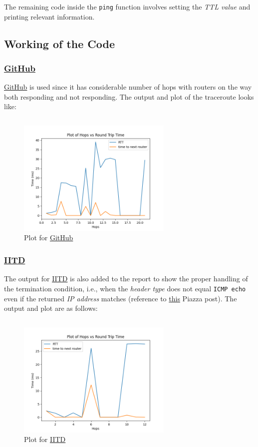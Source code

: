 \documentclass[11pt]{article}
\begin{document}
The remaining code inside the \texttt{ping} function involves setting the \textit{TTL value} and printing relevant information.

\subsection{Working of the Code}

\subsubsection{\href{https://www.github.com}{GitHub}}
\href{https://www.github.com}{GitHub} is used since it has considerable number of hops with routers on the way both responding and not responding. The output and plot of the traceroute looks like:

\inputminted[bgcolor=mintedbg]{text}{outputs/my_traceroute_github}

\begin{figure}[H]
    \centering
    \includegraphics[width=0.66\textwidth]{my_traceroute_github}
    \caption{Plot for \href{https://www.github.com}{GitHub}}
\end{figure}


\subsubsection{\href{https://www.iitd.ac.in}{IITD}}
The output for \href{https://www.iitd.ac.in}{IITD} is also added to the report to show the proper handling of the termination condition, i.e., when the \textit{header type} does not equal \texttt{ICMP echo} even if the returned \textit{IP address} matches (reference to \href{https://piazza.com/class/ksadh5klx166sx?cid=9}{this} Piazza post). The output and plot are as follows:

\inputminted[bgcolor=mintedbg]{text}{outputs/my_traceroute_iitd}

\begin{figure}[H]
    \centering
    \includegraphics[width=0.66\textwidth]{my_traceroute_iitd}
    \caption{Plot for \href{https://www.iitd.ac.in}{IITD}}
\end{figure}
\end{document}

